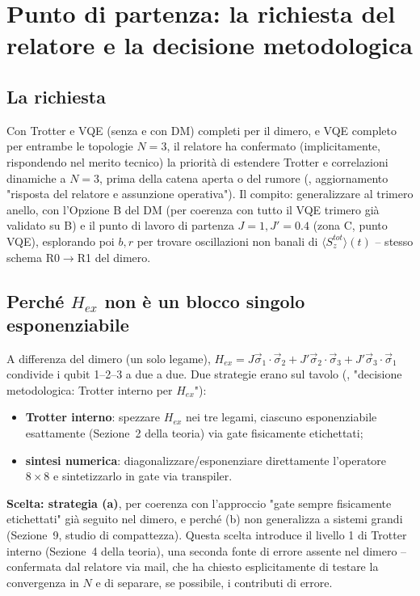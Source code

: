 \documentclass[11pt,a4paper]{article}
\begin{document}
\section{Punto di partenza: la richiesta del relatore e la decisione metodologica}

\subsection{La richiesta}

Con Trotter e VQE (senza e con DM) completi per il dimero, e VQE completo
per entrambe le topologie $N=3$, il relatore ha confermato (implicitamente,
rispondendo nel merito tecnico) la priorità di estendere Trotter e
correlazioni dinamiche a $N=3$, prima della catena aperta o del rumore
(\texttt{}, aggiornamento "risposta del relatore e
assunzione operativa"). Il compito: generalizzare
\texttt{} al trimero anello, con l'Opzione B del DM (per
coerenza con tutto il VQE trimero già validato su B) e il punto di lavoro
di partenza $J=1,J'=0.4$ (zona C, punto VQE), esplorando poi $b,r$ per
trovare oscillazioni non banali di $\langle S_z^{tot}\rangle(t)$ -- stesso
schema R0$\to$R1 del dimero.

\subsection{Perché $H_{ex}$ non è un blocco singolo esponenziabile}

A differenza del dimero (un solo legame), $H_{ex}=J\vec\sigma_1\!\cdot\!\vec\sigma_2+J'\vec\sigma_2\!\cdot\!\vec\sigma_3+J'\vec\sigma_3\!\cdot\!\vec\sigma_1$
condivide i qubit 1--2--3 a due a due. Due strategie erano sul tavolo
(\texttt{}, "decisione metodologica: Trotter interno per
$H_{ex}$"):
\begin{itemize}
\item[(a)] \textbf{Trotter interno}: spezzare $H_{ex}$ nei tre legami,
ciascuno esponenziabile esattamente (Sezione~2 della teoria) via gate
fisicamente etichettati;
\item[(b)] \textbf{sintesi numerica}: diagonalizzare/esponenziare
direttamente l'operatore $8\times8$ e sintetizzarlo in gate via
transpiler.
\end{itemize}
\textbf{Scelta: strategia (a)}, per coerenza con l'approccio "gate sempre
fisicamente etichettati" già seguito nel dimero, e perché (b) non
generalizza a sistemi grandi (Sezione~9, studio di compattezza). Questa
scelta introduce il livello 1 di Trotter interno (Sezione~4 della teoria),
una seconda fonte di errore assente nel dimero -- confermata dal relatore
via mail, che ha chiesto esplicitamente di testare la convergenza in $N$ e
di separare, se possibile, i contributi di errore.
\end{document}
